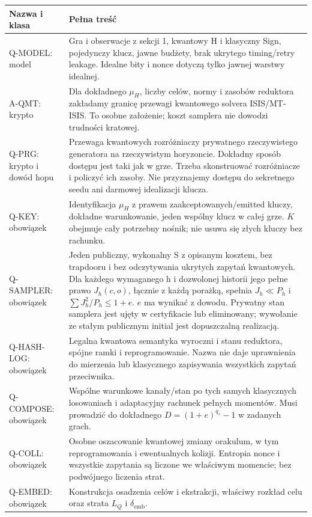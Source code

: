 \documentclass[11pt,a4paper]{article}
\begin{document}
\begin{longtable}{@{}p{.22\linewidth}p{.71\linewidth}@{}}
\toprule Nazwa i klasa & Pełna treść \\\midrule\endhead
Q-MODEL: model & Gra i obserwacje z sekcji 1, kwantowy H i klasyczny Sign,
pojedynczy klucz, jawne budżety, brak ukrytego timing/retry leakage.
Idealne bity i nonce dotyczą tylko jawnej warstwy idealnej.\\
A-QMT: krypto & Dla dokładnego $\mu_H$, liczby celów, normy i zasobów
reduktora zakładamy granicę przewagi kwantowego solvera ISIS/MT-ISIS.
To osobne założenie; koszt samplera nie dowodzi trudności kratowej.\\
Q-PRG: krypto i dowód hopu & Przewaga kwantowych rozróżniaczy prywatnego
rzeczywistego generatora na rzeczywistym horyzoncie. Dokładny sposób dostępu
jest taki jak w grze. Trzeba skonstruować rozróżniacze i policzyć ich zasoby.
Nie przyznajemy dostępu do sekretnego seedu ani darmowej idealizacji klucza.\\
Q-KEY: obowiązek & Identyfikacja $\mu_H$ z prawem zaakceptowanych/emitted
kluczy, dokładne warunkowanie, jeden wspólny klucz w całej grze.
$K$ obejmuje cały potrzebny nośnik; nie usuwa się złych kluczy bez rachunku.\\
Q-SAMPLER: obowiązek & Jeden publiczny, wykonalny S z opisanym kosztem,
bez trapdooru i bez odczytywania ukrytych zapytań kwantowych.
Dla każdego wymaganego h i dozwolonej historii jego pełne prawo
$J_h(c,o)$, łącznie z każdą porażką, spełnia $J_h\ll P_h$ i
$\sum J_h^2/P_h\le1+e$. $e$ ma wynikać z dowodu.
Prywatny stan samplera jest ujęty w certyfikacie lub eliminowany;
wywołanie ze stałym publicznym initial jest dopuszczalną realizacją.\\
Q-HASH-LOG: obowiązek & Legalna kwantowa semantyka wyroczni i stanu reduktora,
spójne ramki i reprogramowanie. Nazwa nie daje uprawnienia do mierzenia
lub klasycznego zapisywania wszystkich zapytań przeciwnika.\\
Q-COMPOSE: obowiązek & Wspólne warunkowe kanały/stan po tych samych
klasycznych losowaniach i adaptacyjny rachunek pełnych momentów.
Musi prowadzić do dokładnego $D=(1+e)^{q_s}-1$ w zadanych grach.\\
Q-COLL: obowiązek & Osobne oszacowanie kwantowej zmiany orakulum,
w tym reprogramowania i ewentualnych kolizji. Entropia nonce i wszystkie
zapytania są liczone we właściwym momencie; bez podwójnego liczenia strat.\\
Q-EMBED: obowiązek & Konstrukcja osadzenia celów i ekstrakcji,
właściwy rozkład celu oraz strata $L_Q$ i $\delta_{\mathrm{emb}}$.

\end{longtable}
\end{document}
